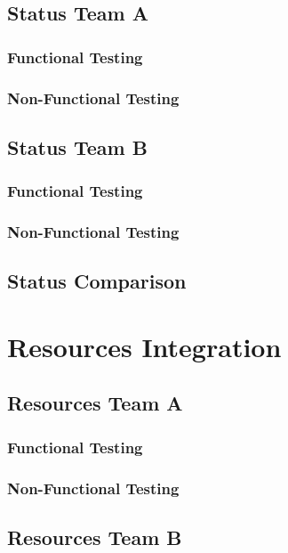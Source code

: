 \documentclass[12pt, oneside]{article}
\begin{document}
	\subsection{Status Team A}	
		\subsubsection{Functional Testing}
			
		\subsubsection{Non-Functional Testing }
			
	
	\subsection{Status Team B}	
		\subsubsection{Functional Testing}
			
		\subsubsection{Non-Functional Testing }
			
	
	\subsection{Status Comparison}
\newpage 
\section{Resources Integration}
	\subsection{Resources Team A}	
		\subsubsection{Functional Testing}
			
		\subsubsection{Non-Functional Testing }
			
	
	\subsection{Resources Team B}	
\end{document}

